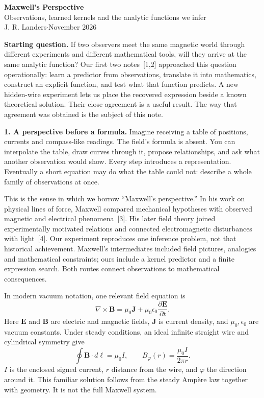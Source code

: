 \documentclass[11pt,letterpaper]{article}
\begin{document}
\begin{center}
{\Large\bfseries Maxwell's Perspective}\\[3pt]
{\large Observations, learned kernels and the analytic functions we infer}\\[3pt]
{\small J. R. Landers\quad$\cdot$\quad November 2026}
\end{center}
\vspace{-6pt}

\textbf{Starting question.}
If two observers meet the same magnetic world through different experiments and
different mathematical tools, will they arrive at the same analytic function?
Our first two notes~[1,2] approached this question operationally: learn a predictor
from observations, translate it into mathematics, construct an explicit function,
and test what that function predicts. A new hidden-wire experiment lets us place
the recovered expression beside a known theoretical solution. Their close
agreement is a useful result. The way that agreement was obtained is the subject
of this note.

\textbf{1. A perspective before a formula.}
Imagine receiving a table of positions, currents and compass-like readings.
The field's formula is absent. You can interpolate the table, draw curves through
it, propose relationships, and ask what another observation would show.
Every step introduces a representation. Eventually a short equation may do what
the table could not: describe a whole family of observations at once.

This is the sense in which we borrow ``Maxwell's perspective.'' In his work on
physical lines of force, Maxwell compared mechanical hypotheses with observed
magnetic and electrical phenomena~[3]. His later field theory joined experimentally
motivated relations and connected electromagnetic disturbances with light~[4].
Our experiment reproduces one inference problem, not that historical achievement.
Maxwell's intermediates included field pictures, analogies and mathematical
constraints; ours include a kernel predictor and a finite expression search.
Both routes connect observations to mathematical consequences.

In modern vacuum notation, one relevant field equation is
\begin{equation}
\nabla\times\mathbf B
=\mu_0\mathbf J+\mu_0\epsilon_0\frac{\partial\mathbf E}{\partial t}.
\label{eq:ampere}
\end{equation}
Here $\mathbf E$ and $\mathbf B$ are electric and magnetic fields, $\mathbf J$ is
current density, and $\mu_0,\epsilon_0$ are vacuum constants. Under steady conditions,
an ideal infinite straight wire and cylindrical symmetry give
\begin{equation}
\oint\mathbf B\cdot d\boldsymbol\ell=\mu_0 I,
\qquad B_\varphi(r)=\frac{\mu_0 I}{2\pi r}.
\label{eq:wire}
\end{equation}
$I$ is the enclosed signed current, $r$ distance from the wire, and $\varphi$
the direction around it. This familiar solution follows from the steady
Amp\`ere law together with geometry. It is not the full Maxwell system.
\end{document}
